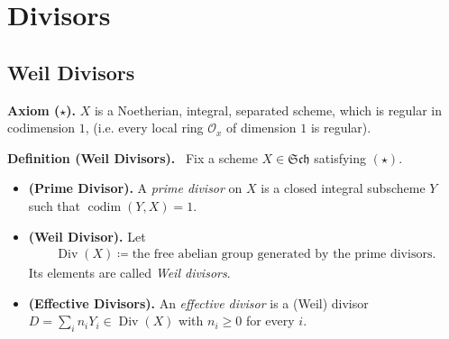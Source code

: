 \documentclass[11pt,a4paper,footinclude=true,headinclude=true]{scrbook} %
\DeclareMathOperator{\Div}{Div}
\DeclareMathOperator{\codim}{codim}
\newcommand{\OO}{\mathcal{O}}
\newcommand{\Sch}{\mathfrak{Sch}}
\newcommand{\<}{\langle}
\newcommand{\>}{\rangle}
\newenvironment{definition}[2][Definition]
    { \begin{mdframed}[backgroundcolor=gray!20] \textbf{#1 #2.}\ }
    {  \end{mdframed}}
\newenvironment{axiom}[2][Axiom]
    { \begin{mdframed}[backgroundcolor=red!20] \textbf{#1 #2.} }
    {  \end{mdframed}}
\begin{document}
\chapter{Divisors}
\section{Weil Divisors}
\begin{axiom}{($\star$)}
    $X$ is a Noetherian, integral, separated scheme, which is regular in codimension $1$, (i.e. every local ring $\OO_x$ of dimension $1$ is regular).
\end{axiom}

\begin{definition}{(Weil Divisors)}
    Fix a scheme $X\in\Sch$ satisfying $(\star)$.
    \begin{itemize}
        \item \textbf{(Prime Divisor).} A \textit{prime divisor} on $X$ is a closed integral subscheme $Y$ such that $\codim(Y,X)=1$.
        \item \textbf{(Weil Divisor).} Let
        \begin{align*}
            \Div(X)\coloneqq\text{the free abelian group generated by the prime divisors}.
        \end{align*}
        Its elements are called \textit{Weil divisors}.
        \item \textbf{(Effective Divisors).} An \textit{effective divisor} is a (Weil) divisor $D=\sum_in_iY_i\in\Div(X)$ with $n_i\geq0$ for every $i$.
    \end{itemize}
\end{definition}
\end{document}
